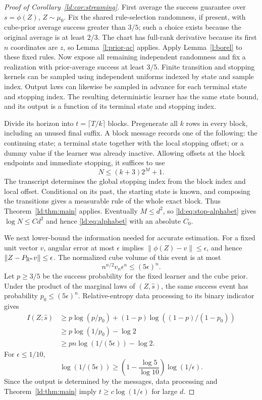 \begin{proof}[Proof of Corollary~\ref{ld:cor:streaming}]
First average the success guarantee over $s=\phi(Z)$, $Z\sim\mu_0$.
Fix the shared rule-selection randomness, if present, with cube-prior
average success greater than $3/5$; such a choice exists because the
original average is at least $2/3$. The chart has full-rank derivative because its first \(n\) coordinates are \(z\), so Lemma~\ref{l:prior-ac} applies. Apply Lemma~\ref{l:borel} to these fixed rules. Now expose all remaining independent randomness and
fix a realization with prior-average success at least $3/5$.
Finite transition and stopping
kernels can be sampled using independent uniforms indexed by state and
sample index. Output laws can likewise be sampled in advance for each
terminal state and stopping index. The resulting deterministic learner
has the same state bound, and its output is a function of its terminal
state and stopping index.

Divide its horizon into $t=\lceil T/k\rceil$ blocks. Pregenerate all
$k$ rows in every block, including an unused final suffix. A block
message records one of the following: the continuing state; a terminal
state together with the local stopping offset; or a dummy value if the
learner was already inactive. Allowing offsets at the block endpoints
and immediate stopping, it suffices to use
\begin{equation}\label{ld:eq:stop-alphabet}
 N\le(k+3)2^M+1.
\end{equation}
The transcript determines the global stopping index from the block
index and local offset. Conditional on its past, the starting state is
known, and composing the transitions gives a measurable rule of the
whole exact block. Thus Theorem~\ref{ld:thm:main} applies. Eventually
$M\le d^2$, so \eqref{ld:eq:stop-alphabet} gives $\log N\le Cd^2$
and hence \eqref{ld:eq:alphabet} with an absolute $C_0$.

We next lower-bound the information needed for accurate estimation.
For a fixed unit vector $v$, angular error at most $\epsilon$ implies
$\|\phi(Z)-v\|\le\epsilon$, and hence
$\|Z-P_{\mathbb R^n}v\|\le\epsilon$. The normalized cube volume of this
event is at most
\begin{equation}\label{ld:eq:cap}
 n^{n/2}v_n\epsilon^n\le(5\epsilon)^n.
\end{equation}
Let $p\ge3/5$ be the success probability for the fixed learner and
the cube prior. Under the product of the marginal laws of
$(Z,\widehat s)$, the same success event has probability
$p_0\le(5\epsilon)^n$. Relative-entropy data processing to its binary
indicator gives
\begin{align*}
 I(Z;\widehat s)
 &\ge p\log(p/p_0)+(1-p)\log((1-p)/(1-p_0))\\
 &\ge p\log(1/p_0)-\log2\\
 &\ge pn\log(1/(5\epsilon))-\log2.
\end{align*}
For $\epsilon\le1/10$,
\[
 \log(1/(5\epsilon))
 \ge\left(1-\frac{\log5}{\log10}\right)\log(1/\epsilon).
\]
Since the output is determined by the messages, data processing and
Theorem~\ref{ld:thm:main} imply $t\ge c\log(1/\epsilon)$ for large $d$.


\end{proof}
